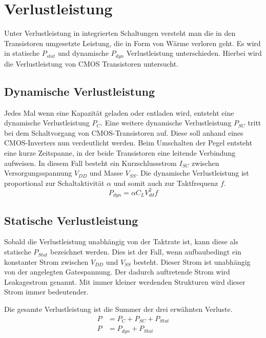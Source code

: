 \section{Verlustleistung}
\label{sec:verlustleistung}
Unter Verlustleistung in integrierten Schaltungen versteht man die in den Transistoren umgesetzte Leistung, die in Form von Wärme verloren geht.
Es wird in statische \(P_{stat}\) und dynamische \(P_{dyn}\) Verlustleistung unterschieden. \cite[Seite 4 ff.]{flynn2007low} Hierbei wird die Verlustleistung von CMOS Transistoren untersucht.
\subsection{Dynamische Verlustleistung}\label{subsec:dynVerl}
Jedes Mal wenn eine Kapazität geladen oder entladen wird, entsteht eine dynamische Verlustleistung \(P_C\). Eine weitere dynamische Verlustleistung \(P_{SC}\) tritt bei dem Schaltvorgang von CMOS-Transistoren auf. Diese soll anhand eines CMOS-Inverters nun verdeutlicht werden. Beim Umschalten der Pegel entsteht eine kurze Zeitspanne, in der beide Transistoren eine leitende Verbindung aufweisen. In diesem Fall besteht ein Kurzschlussstrom \(I_{SC}\) zwischen Versorgungsspannung \(V_{DD}\) und Masse \(V_{SS}\). Die dynamische Verlustleistung ist proportional zur Schaltaktivität \(\alpha\) und somit auch zur Taktfrequenz $f$.\cite[Seite 4 ff.]{flynn2007low}
\begin{equation}
P_{dyn} = \alpha  C_L  V_{dd}^{2}  f
\label{eq:dynVerlustleistung}
\end{equation}
\subsection{Statische Verlustleistung}\label{subsec:statVerl}
Sobald die Verlustleistung unabhängig von der Taktrate ist, kann diese als statische \(P_{Stat}\) bezeichnet werden. Dies ist der Fall, wenn aufbaubedingt ein konstanter Strom zwischen \(V_{DD}\) und \(V_{SS}\) besteht. Dieser Strom ist unabhängig von der angelegten Gatespannung. Der dadurch auftretende Strom wird Leakagestrom genannt. Mit immer kleiner werdenden Strukturen wird dieser Strom immer bedeutender.\cite[Seite 8]{flynn2007low}

Die gesamte Verlustleistung ist die Summer der drei erwähnten Verluste.
\begin{equation}
\begin{aligned}
P &= P_{ C }+P_{ SC }+P_{ Stat}\\
P &= P_{dyn}+P_{Stat}
\label{eq:verlustleistung}
\end{aligned}
\end{equation}

